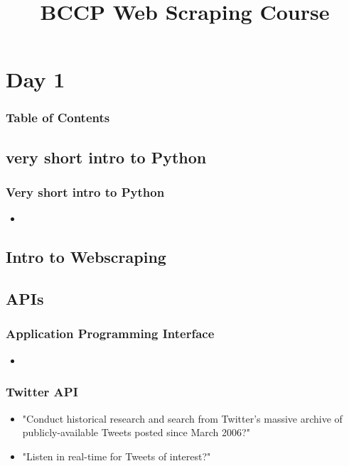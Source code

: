 \documentclass[english,aspectratio=169]{beamer}
\begin{document}
\title[Web scraping]{BCCP Web Scraping Course}
\titlegraphic{}

\author[]{}

\date[]{}

\begin{frame}
    \titlepage
\end{frame}

\section{Day 1}
\label{sec:day1}


\begin{frame}
    \frametitle{Table of Contents}
    \tableofcontents[currentsection]
\end{frame}

\subsection{very short intro to Python}
\label{sec:intropython}

\begin{frame}
    \frametitle{Very short intro to Python}
    \begin{itemize}
        \item
    \end{itemize}
\end{frame}

\subsection{Intro to Webscraping}
\label{sec:introwebscraping}



\subsection{APIs}
\label{sec:apis}

\begin{frame}
    \frametitle{Application Programming Interface}
    \begin{itemize}
        \item
    \end{itemize}
\end{frame}

\begin{frame}
    \frametitle{Twitter API}
    \begin{itemize}
        \item "Conduct historical research and search from Twitter's massive
        archive of publicly-available Tweets posted since March 2006?"
        \item "Listen in real-time for Tweets of interest?"
    \end{itemize}
\end{frame}
\end{document}
